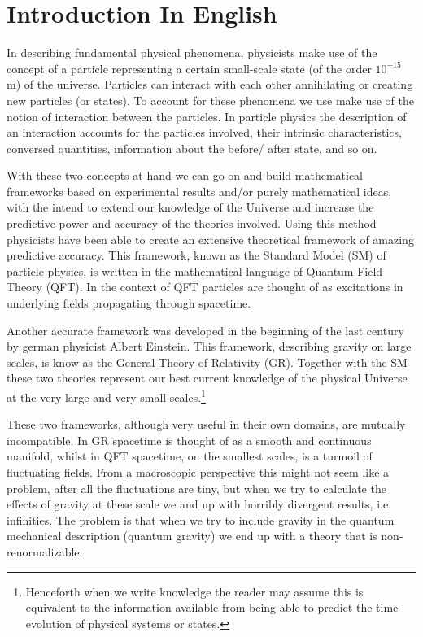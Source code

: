 \section{Introduction In English}
In describing fundamental physical phenomena, physicists make use of the concept of a particle representing a certain small-scale state (of the order $10^{-15}$ m) of the universe. Particles can interact with each other annihilating or creating new particles (or states). To account for these phenomena we use make use of the notion of interaction between the particles. In particle physics the description of an interaction accounts for the particles involved, their intrinsic characteristics, conversed quantities, information about the before/ after state, and so on.

With these two concepts at hand we can go on and build mathematical frameworks based on experimental results and/or purely mathematical ideas, with the intend to extend our knowledge of the Universe and increase the predictive power and accuracy of the theories involved. Using this method physicists have been able to create an extensive theoretical framework of amazing predictive accuracy. This framework, known as the Standard Model (SM) of particle physics, is written in the mathematical language of Quantum Field Theory (QFT). In the context of QFT particles are thought of as excitations in underlying fields propagating through spacetime.

Another accurate framework was developed in the beginning of the last century by german physicist Albert Einstein. This framework, describing gravity on large scales, is know as the General Theory of Relativity (GR). Together with the SM these two theories represent our best current knowledge of the physical Universe at the very large and very small scales.\footnote{Henceforth when we write knowledge the reader may assume this is equivalent to the information available from being able to predict the time evolution of physical systems or states.}

These two frameworks, although very useful in their own domains, are mutually incompatible. In GR spacetime is thought of as a smooth and continuous manifold, whilst in QFT spacetime, on the smallest scales, is a turmoil of fluctuating fields. From a macroscopic perspective this might not seem like a problem, after all the fluctuations are tiny, but when we try to calculate the effects of gravity at these scale we and up with horribly divergent results, i.e. infinities. The problem is that when we try to include gravity in the quantum mechanical description (quantum gravity) we end up with a theory that is non-renormalizable.

